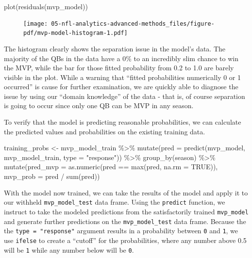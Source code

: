 \documentclass[
  letterpaper,
]{krantz}
\newenvironment{Shaded}{\begin{snugshade}}{\end{snugshade}}
\newcommand{\AttributeTok}[1]{\textcolor[rgb]{0.40,0.45,0.13}{#1}}
\newcommand{\ConstantTok}[1]{\textcolor[rgb]{0.56,0.35,0.01}{#1}}
\newcommand{\FunctionTok}[1]{\textcolor[rgb]{0.28,0.35,0.67}{#1}}
\newcommand{\NormalTok}[1]{\textcolor[rgb]{0.00,0.23,0.31}{#1}}
\newcommand{\OtherTok}[1]{\textcolor[rgb]{0.00,0.23,0.31}{#1}}
\newcommand{\SpecialCharTok}[1]{\textcolor[rgb]{0.37,0.37,0.37}{#1}}
\newcommand{\StringTok}[1]{\textcolor[rgb]{0.13,0.47,0.30}{#1}}
\begin{document}
\begin{Shaded}
\begin{Highlighting}[]
\FunctionTok{plot}\NormalTok{(}\FunctionTok{residuals}\NormalTok{(mvp\_model))}
\end{Highlighting}
\end{Shaded}

\begin{figure}[H]

{\centering \texttt{[image: 05-nfl-analytics-advanced-methods\_files/figure-pdf/mvp-model-histogram-1.pdf]}

}

\end{figure}

The histogram clearly shows the separation issue in the model's data.
The majority of the QBs in the data have a 0\% to an incredibly slim
chance to win the MVP, while the bar for those fitted probability from
0.2 to 1.0 are barely visible in the plot. While a warning that ``fitted
probabilities numerically 0 or 1 occurred'' is cause for further
examination, we are quickly able to diagnose the issue by using our
``domain knowledge'' of the data - that is, of course separation is
going to occur since only one QB can be MVP in any season.

To verify that the model is predicting reasonable probabilities, we can
calculate the predicted values and probabilities on the existing
training data.

\begin{Shaded}
\begin{Highlighting}[]
\NormalTok{training\_probs }\OtherTok{\textless{}{-}}\NormalTok{ mvp\_model\_train }\SpecialCharTok{\%\textgreater{}\%}
  \FunctionTok{mutate}\NormalTok{(}\AttributeTok{pred =} \FunctionTok{predict}\NormalTok{(mvp\_model, mvp\_model\_train,}
                        \AttributeTok{type =} \StringTok{"response"}\NormalTok{)) }\SpecialCharTok{\%\textgreater{}\%}
  \FunctionTok{group\_by}\NormalTok{(season) }\SpecialCharTok{\%\textgreater{}\%}
  \FunctionTok{mutate}\NormalTok{(}\AttributeTok{pred\_mvp =} \FunctionTok{as.numeric}\NormalTok{(pred }\SpecialCharTok{==} \FunctionTok{max}\NormalTok{(pred, }\AttributeTok{na.rm =} \ConstantTok{TRUE}\NormalTok{)),}
         \AttributeTok{mvp\_prob =}\NormalTok{ pred }\SpecialCharTok{/} \FunctionTok{sum}\NormalTok{(pred))}
\end{Highlighting}
\end{Shaded}

With the model now trained, we can take the results of the model and
apply it to our withheld \texttt{mvp\_model\_test} data frame. Using the
\texttt{predict} function, we instruct to take the modeled predictions
from the satisfactorily trained \texttt{mvp\_model} and generate further
predictions on the \texttt{mvp\_model\_test} data frame. Because the the
\texttt{type\ =\ "response"} argument results in a probability between
\texttt{0} and \texttt{1}, we use \texttt{ifelse} to create a ``cutoff''
for the probabilities, where any number above 0.5 will be \texttt{1}
while any number below will be \texttt{0}.
\end{document}
